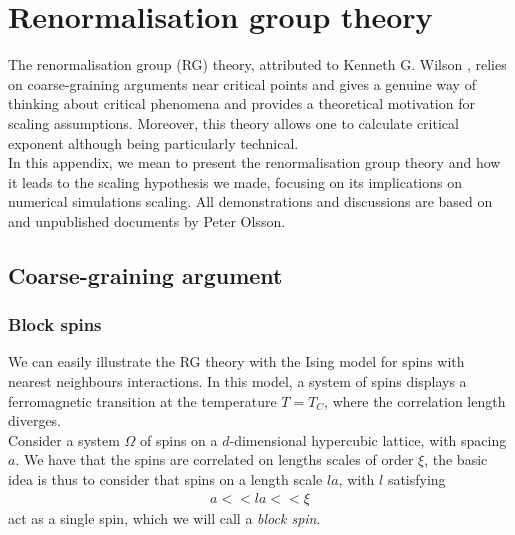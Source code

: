 \documentclass[class=report, float=false, crop=false]{standalone}
\begin{document}
\chapter{Renormalisation group theory}
\label{appendix:rg}

The renormalisation group (RG) theory, attributed to Kenneth G. Wilson \cite{wilson1971renormalization,wilson1974renormalization,wilson1975renormalization}, relies on coarse-graining arguments near critical points and gives a genuine way of thinking about critical phenomena and provides a theoretical motivation for scaling assumptions. Moreover, this theory allows one to calculate critical exponent although being particularly technical.\\

In this appendix, we mean to present the renormalisation group theory and how it leads to the scaling hypothesis we made, focusing on its implications on numerical simulations scaling. All demonstrations and discussions are based on \cite{goldenfeld1992lectures} and unpublished documents by Peter Olsson.

\section{Coarse-graining argument}

\subsection{Block spins}
\label{block_spins}

We can easily illustrate the RG theory with the Ising model for spins with nearest neighbours interactions. In this model, a system of spins displays a ferromagnetic transition at the temperature $T=T_C$, where the correlation length diverges.\\

Consider a system $\Omega$ of spins on a $d$-dimensional hypercubic lattice, with spacing $a$. We have that the spins are correlated on lengths scales of order $\xi$, the basic idea is thus to consider that spins on a length scale $la$, with $l$ satisfying
\begin{align*}
a << la << \xi
\end{align*}
act as a single spin, which we will call a \textit{block spin}.\\
\end{document}
